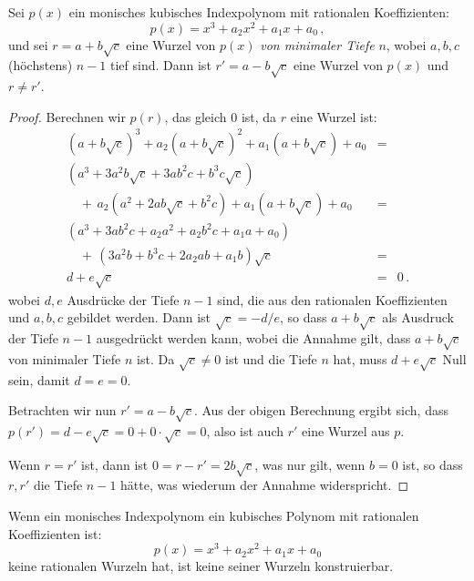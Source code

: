 \begin{theorem}\label{thm.trisect.conjugate}
Sei $p(x)$ ein monisches kubisches Indexpolynom mit rationalen Koeffizienten:
\[
p(x)=x^3+a_2x^2+a_1x+a_0\,,
\]
und sei $r=a+b\sqrt{c}$ eine Wurzel von $p(x)$ \emph{von minimaler Tiefe} $n$, wobei $a,b,c$ (höchstens) $n-1$ tief sind. Dann ist $r'=a-b\sqrt{c}$ eine Wurzel von $p(x)$ und $r\neq r'$.
\end{theorem}

\begin{proof} Berechnen wir $p(r)$, das gleich $0$ ist, da $r$ eine Wurzel ist:
\[
\renewcommand{\arraystretch}{1.4}
\begin{array}{lcr}
(a+b\sqrt{c})^3+a_2(a+b\sqrt{c})^2+a_1(a+b\sqrt{c})+a_0&=\\
(a^3+3a^2b\sqrt{c}+3ab^2c+b^3c\sqrt{c})\\
\quad+\,a_2(a^2+2ab\sqrt{c}+b^2c) +a_1(a+b\sqrt{c}) +a_0&=\\
(a^3+3ab^2c+a_2a^2+a_2b^2c+a_1a+a_0)\\
\quad+\,(3a^2b+b^3c+2a_2ab+a_1b)\sqrt{c}&=\\
d+e\sqrt{c}&=&0\,.
\end{array}
\]
wobei $d,e$ Ausdrücke der Tiefe $n-1$ sind, die aus den rationalen Koeffizienten und $a,b,c$ gebildet werden. Dann ist $\sqrt{c}=-d/e$, so dass $a+b\sqrt{c}$ als Ausdruck der Tiefe $n-1$ ausgedrückt werden kann, wobei die Annahme gilt, dass $a+b\sqrt{c}$ von minimaler Tiefe $n$ ist. Da $\sqrt{c}\neq 0$ ist und die Tiefe $n$ hat, muss $d+e\sqrt{c}$ Null sein, damit $d=e=0$.

Betrachten wir nun $r'=a-b\sqrt{c}$. Aus der obigen Berechnung ergibt sich, dass $p(r')=d-e\sqrt{c}=0+0\cdot\sqrt{c}=0$, also ist auch $r'$ eine Wurzel aus $p$.

Wenn $r= r'$ ist, dann ist $0=r-r'=2b\sqrt{c}$, was nur gilt, wenn $b=0$ ist, so dass $r,r'$ die Tiefe $n-1$ hätte, was wiederum der Annahme widerspricht.
\end{proof}                                

\begin{theorem}
Wenn ein monisches Indexpolynom ein kubisches Polynom mit rationalen Koeffizienten ist:
\[p(x)=x^3+a_2x^2+a_1x+a_0\]
keine rationalen Wurzeln hat, ist keine seiner Wurzeln konstruierbar.
\end{theorem}

